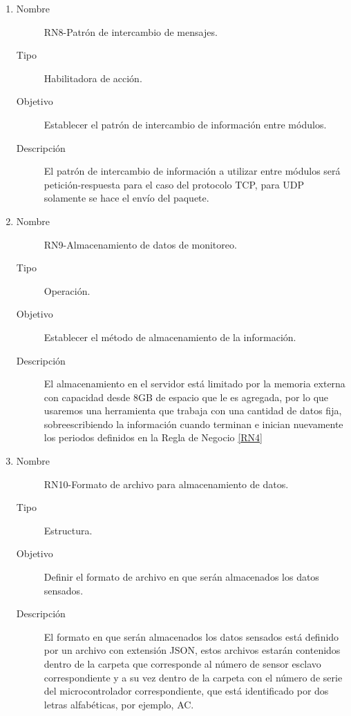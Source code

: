 \begin{enumerate}[label=RN\arabic*.]
\item \label{RN8}
		\begin{description}
			\item[Nombre] RN8-Patrón de intercambio de mensajes.
			\item[Tipo] Habilitadora de acción.
			\item[Objetivo] Establecer el patrón de intercambio de información entre módulos.
			\item[Descripción] El patrón de intercambio de información a utilizar entre módulos será petición-respuesta para el caso del protocolo TCP, para UDP solamente se hace el envío del paquete.
		\end{description}
		
\item \label{RN9}
		\begin{description}
			\item[Nombre] RN9-Almacenamiento de datos de monitoreo.
			\item[Tipo] Operación.
			\item[Objetivo] Establecer el método de almacenamiento de la información.
			\item[Descripción] El almacenamiento en el servidor está limitado por la memoria externa con capacidad desde 8GB de espacio que le es agregada, por lo que usaremos una herramienta que trabaja con una cantidad de datos fija, sobreescribiendo la información cuando terminan e inician nuevamente los periodos definidos en la Regla de Negocio \ref{RN4}		\end{description}


\item \label{RN10}
		\begin{description}
			\item[Nombre] RN10-Formato de archivo para almacenamiento de datos.
			\item[Tipo] Estructura.
			\item[Objetivo] Definir el formato de archivo en que serán almacenados los datos sensados.
			\item[Descripción] El formato en que serán almacenados los datos sensados está definido por un archivo con extensión JSON, estos archivos estarán contenidos dentro de la carpeta que corresponde al número de sensor esclavo correspondiente y a su vez dentro de la carpeta con el número de serie del microcontrolador correspondiente, que está identificado por dos letras alfabéticas, por ejemplo, AC.		
		\end{description}
		

\end{enumerate}
